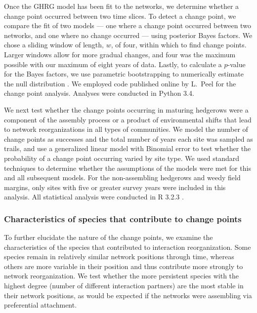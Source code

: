 \documentclass[12pt]{article}
\begin{document}
Once the GHRG model has been fit to the networks, we determine whether
a change point occurred between two time slices. To detect a change
point, we compare the fit of two models --- one where a change point
occurred between two networks, and one where no change occurred ---
using posterior Bayes factors. We chose a sliding window of length,
$w$, of four, within which to find change points. Larger windows allow
for more gradual changes, and four was the maximum possible with our
maximum of eight years of data. Lastly, to calculate a $p$-value for
the Bayes factors, we use parametric bootstrapping to numerically
estimate the null distribution \citep{peel2014detecting}. We employed
code published online by L.~Peel for the change point
analysis. Analyses were conducted in Python 3.4.

We next test whether the change points occurring in maturing hedgerows
were a component of the assembly process or a product of environmental
shifts that lead to network reorganizations in all types of
communities. We model the number of change points as successes and the
total number of years each site was sampled as trails, and use a
generalized linear model with Binomial error to test whether the
probability of a change point occurring varied by site type. We used
standard techniques to determine whether the assumptions of the models
were met for this and all subsequent models. For the non-assembling
hedgerows and weedy field margins, only sites with five or greater
survey years were included in this analysis. All statistical analysis
were conducted in R 3.2.3 \citep{R}.

\subsubsection*{Characteristics of species that contribute to change
  points}

To further elucidate the nature of the change points, we examine the
characteristics of the species that contributed to interaction
reorganization. Some species remain in relatively similar network
positions through time, whereas others are more variable in their
position and thus contribute more strongly to network
reorganization. We test whether the more persistent species with the
highest degree (number of different interaction partners) are the
most stable in their network positions, as would be expected if the
networks were assembling via preferential attachment.
\end{document}
